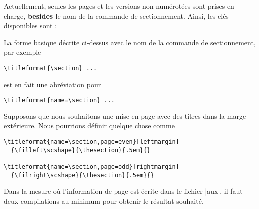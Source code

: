 \documentclass[a4paper]{ltxguide}
\newcommand{\trad}[1]{\textbf{\textcolor{orange5}{\noindent\ding{54} #1 \ding{54}}}}
\begin{document}
Actuellement, seules les pages et les versions non numérotées sont prises en charge, \trad{besides} le nom de la commande de sectionnement. Ainsi, les clés disponibles sont :
La forme basique décrite ci-dessus avec le nom de la commande de sectionnement, par exemple
\begin{verbatim}
\titleformat{\section} ...
\end{verbatim}
est en fait une abréviation pour
\begin{verbatim}
\titleformat{name=\section} ...
\end{verbatim}
Supposons que nous souhaitons une mise en page avec des titres dans la marge extérieure. 
Nous pourrions définir quelque chose comme 
\begin{verbatim}
\titleformat{name=\section,page=even}[leftmargin]
  {\filleft\scshape}{\thesection}{.5em}{}

\titleformat{name=\section,page=odd}[rightmargin]
  {\filright\scshape}{\thesection}{.5em}{}
\end{verbatim}
Dans la mesure où l'information de page est écrite dans le fichier |aux|, il faut deux compilations au minimum pour obtenir le résultat souhaité.
\end{document}
